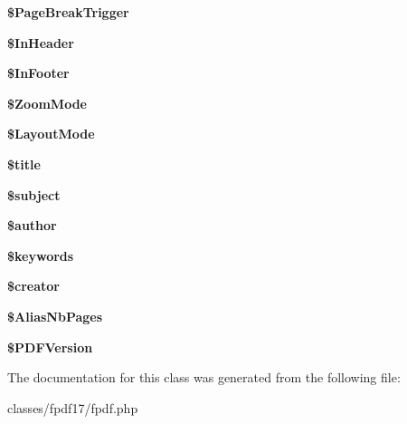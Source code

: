 \begin{DoxyCompactItemize}
\item 
\hypertarget{classFPDF_a1a0fd03d8f95b0119fed813fe5c980a8}{}{\bfseries \$\+Page\+Break\+Trigger}\label{classFPDF_a1a0fd03d8f95b0119fed813fe5c980a8}

\item 
\hypertarget{classFPDF_ad826d8f87302ffc1b53c3af9b32509e2}{}{\bfseries \$\+In\+Header}\label{classFPDF_ad826d8f87302ffc1b53c3af9b32509e2}

\item 
\hypertarget{classFPDF_a9550396e618abf65f024fb07b4c31bdd}{}{\bfseries \$\+In\+Footer}\label{classFPDF_a9550396e618abf65f024fb07b4c31bdd}

\item 
\hypertarget{classFPDF_afc97ebf2f645908e261c641fbf48be92}{}{\bfseries \$\+Zoom\+Mode}\label{classFPDF_afc97ebf2f645908e261c641fbf48be92}

\item 
\hypertarget{classFPDF_a8a1b8f011e83924e04fd4868e6a0fd25}{}{\bfseries \$\+Layout\+Mode}\label{classFPDF_a8a1b8f011e83924e04fd4868e6a0fd25}

\item 
\hypertarget{classFPDF_a1a9653841a04eab8f7792dc620ad768f}{}{\bfseries \$title}\label{classFPDF_a1a9653841a04eab8f7792dc620ad768f}

\item 
\hypertarget{classFPDF_a01809a20cac7b1b9123141262ac881e2}{}{\bfseries \$subject}\label{classFPDF_a01809a20cac7b1b9123141262ac881e2}

\item 
\hypertarget{classFPDF_a0fd364189356e647c1e12ff1d264b292}{}{\bfseries \$author}\label{classFPDF_a0fd364189356e647c1e12ff1d264b292}

\item 
\hypertarget{classFPDF_af911783b120fbaaebdad50473826a43a}{}{\bfseries \$keywords}\label{classFPDF_af911783b120fbaaebdad50473826a43a}

\item 
\hypertarget{classFPDF_a8e24c7db53f08092a8038d7aa7d07a48}{}{\bfseries \$creator}\label{classFPDF_a8e24c7db53f08092a8038d7aa7d07a48}

\item 
\hypertarget{classFPDF_a8ca11347db37499aaf473e390db7459b}{}{\bfseries \$\+Alias\+Nb\+Pages}\label{classFPDF_a8ca11347db37499aaf473e390db7459b}

\item 
\hypertarget{classFPDF_a5d794ad25d8bbf69f42452deb7e1a2be}{}{\bfseries \$\+P\+D\+F\+Version}\label{classFPDF_a5d794ad25d8bbf69f42452deb7e1a2be}

\end{DoxyCompactItemize}


The documentation for this class was generated from the following file\+:\begin{DoxyCompactItemize}
\item 
classes/fpdf17/fpdf.\+php\end{DoxyCompactItemize}

